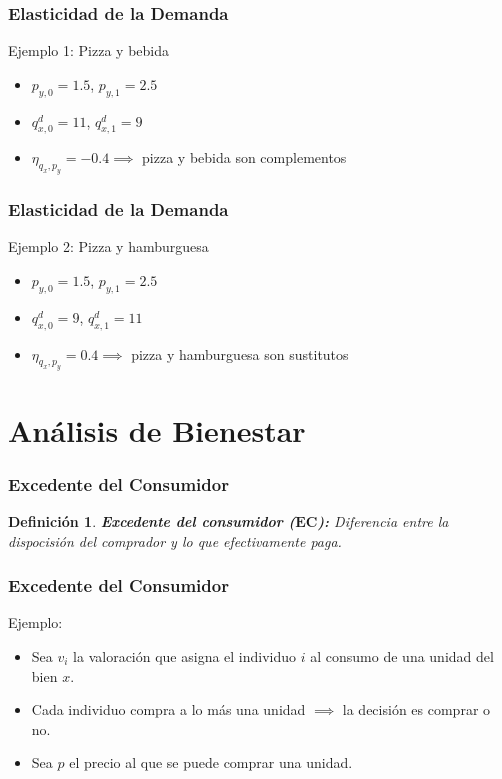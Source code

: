 \documentclass{beamer}
\newtheorem{mydef}{Definición}
\newcommand{\peq}[1]{{\scriptscriptstyle{#1}}}
\begin{document}
		\begin{frame}
			\frametitle{Elasticidad de la Demanda}
			Ejemplo 1: Pizza y bebida
			\begin{itemize}
				\item $p_\peq{y,0}=1.5$, $p_\peq{y,1}=2.5$
				\item $q^\peq{d}_\peq{x,0}=11$, $q^\peq{d}_\peq{x,1}=9$
				\item $\eta_\peq{q_\peq{x},p_\peq{y}}=-0.4\implies$ pizza y bebida son complementos
			\end{itemize}
		\end{frame}		
		
		\begin{frame}
			\frametitle{Elasticidad de la Demanda}
			Ejemplo 2: Pizza y hamburguesa
			\begin{itemize}
				\item $p_\peq{y,0}=1.5$, $p_\peq{y,1}=2.5$
				\item $q^\peq{d}_\peq{x,0}=9$, $q^\peq{d}_\peq{x,1}=11$
				\item $\eta_\peq{q_\peq{x},p_\peq{y}}=0.4\implies$ pizza y hamburguesa son sustitutos
			\end{itemize}
		\end{frame}		

	\section{Análisis de Bienestar}

		\begin{frame}
			\frametitle{Excedente del Consumidor}
			\begin{mydef}
				\textbf{Excedente del consumidor ($\mathbf{EC}$):} Diferencia entre la dispocisión del comprador y lo que efectivamente paga.
			\end{mydef}
		\end{frame}	
	
		\begin{frame}
			\frametitle{Excedente del Consumidor}
			Ejemplo:
			\begin{itemize}
				\item Sea $v_\peq{i}$ la valoración que asigna el individuo $i$ al consumo de una unidad del bien $x$.
				\item Cada individuo compra a lo más una unidad $\implies$ la decisión es comprar o no.
				\item Sea $p$ el precio al que se puede comprar una unidad.
			\end{itemize}
		\end{frame}	
			
\end{document}
